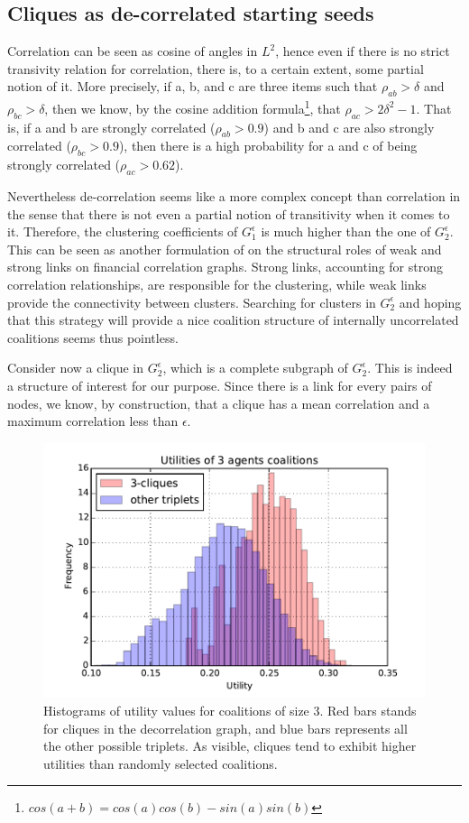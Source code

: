 \documentclass[conference]{IEEEtran}
\begin{document}
\subsection{Cliques as de-correlated starting seeds}
Correlation can be seen as cosine of angles in $ L^{2} $, hence even if there is no strict transivity relation for correlation, there is, to a certain extent, some partial notion of it. More precisely, if a, b, and c are three items such that $ \rho_{ab} > \delta $ and $ \rho_{bc} > \delta $, then we know, by the cosine addition formula\footnote{ $ cos(a+b) = cos(a)cos(b) - sin(a)sin(b) $ }, that $ \rho_{ac} > 2 \delta^{2} - 1 $. That is, if a and b are strongly correlated ($\rho_{ab} > 0.9 $) and b and c are also strongly correlated ($\rho_{bc} > 0.9 $), then there is a high probability for a and c of being strongly correlated ($\rho_{ac} > 0.62 $).

Nevertheless de-correlation seems like a more complex concept than correlation in the sense that there is not even a partial notion of transitivity when it comes to it. Therefore, the clustering coefficients of $ G_{1}^{\epsilon} $ is much higher than the one of $ G_{2}^{\epsilon} $. This can be seen as another formulation of \cite{Garas2008} on the structural roles of weak and strong links on financial correlation graphs. Strong links, accounting for strong correlation relationships, are responsible for the clustering, while weak links provide the connectivity between clusters. Searching for clusters in $ G_{2}^{\epsilon} $ and hoping that this strategy will provide a nice coalition structure of internally uncorrelated coalitions seems thus pointless.

Consider now a clique in  $ G_{2}^{\epsilon} $, which is a complete subgraph of $ G_{2}^{\epsilon} $. This is indeed a structure of interest for our purpose. Since there is a link for every pairs of nodes, we know, by construction, that a clique has a mean correlation and a maximum correlation less than $ \epsilon $. 

\begin{figure}
\includegraphics[scale=.6]{cliques_histo}
\caption{Histograms of utility values for coalitions of size 3. Red bars stands for cliques in the decorrelation graph, and blue bars represents all the other possible triplets. As visible, cliques tend to exhibit higher utilities than randomly selected coalitions.}
\label{fig:histo_cliques}
\end{figure}
\end{document}
